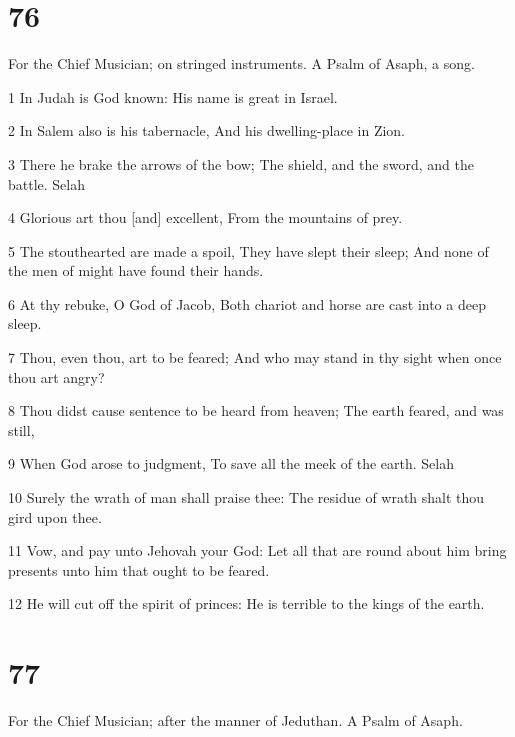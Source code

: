 \chapter{76}

\par For the Chief Musician; on stringed instruments. A Psalm of Asaph, a song.

\par 1 In Judah is God known: His name is great in Israel.
\par 2 In Salem also is his tabernacle, And his dwelling-place in Zion.
\par 3 There he brake the arrows of the bow; The shield, and the sword, and the battle. Selah
\par 4 Glorious art thou [and] excellent, From the mountains of prey.
\par 5 The stouthearted are made a spoil, They have slept their sleep; And none of the men of might have found their hands.
\par 6 At thy rebuke, O God of Jacob, Both chariot and horse are cast into a deep sleep.
\par 7 Thou, even thou, art to be feared; And who may stand in thy sight when once thou art angry?
\par 8 Thou didst cause sentence to be heard from heaven; The earth feared, and was still,
\par 9 When God arose to judgment, To save all the meek of the earth. Selah
\par 10 Surely the wrath of man shall praise thee: The residue of wrath shalt thou gird upon thee.
\par 11 Vow, and pay unto Jehovah your God: Let all that are round about him bring presents unto him that ought to be feared.
\par 12 He will cut off the spirit of princes: He is terrible to the kings of the earth.

\chapter{77}

\par For the Chief Musician; after the manner of Jeduthan. A Psalm of Asaph.

